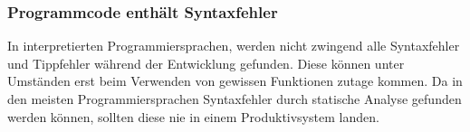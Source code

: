 \subsubsection{Programmcode enthält Syntaxfehler}
\label{ssub:programmcode_enthält_syntaxfehler}
In interpretierten Programmiersprachen, werden nicht zwingend alle Syntaxfehler und Tippfehler während der Entwicklung gefunden. Diese können unter Umständen erst beim Verwenden von gewissen Funktionen zutage kommen. Da in den meisten Programmiersprachen Syntaxfehler durch statische Analyse gefunden werden können, sollten diese nie in einem Produktivsystem landen.
